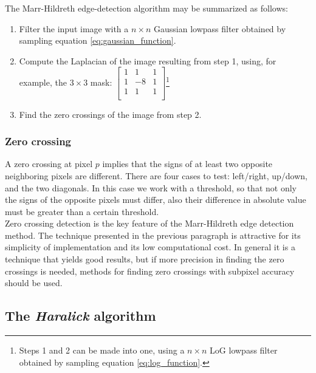 \documentclass{ipol}
\numberwithin{equation}{section}
\numberwithin{table}{section}
\begin{document}
The Marr-Hildreth edge-detection algorithm may be summarized as follows:
\begin{enumerate}
	\item Filter the input image with a $n \times n$ Gaussian lowpass filter obtained by sampling equation \ref{eq:gaussian_function}.
	\item Compute the Laplacian of the image resulting from step 1, using, for example, the $3\times3$ mask:
			$\begin{bmatrix}
			1 &  1 & 1 \\
			1 & -8 & 1 \\
			1 &  1 & 1 \\
			\end{bmatrix}$\footnote{Steps 1 and 2 can be made into one, using a $n\times n$ LoG lowpass filter obtained by sampling equation \ref{eq:log_function}.}
	\item Find the zero crossings of the image from step 2.
\end{enumerate}

\subsubsection{Zero crossing}

A zero crossing at pixel $p$ implies that the signs of at least two opposite neighboring pixels are 
different. There are four cases to test: left/right, up/down, and the two diagonals. In this case 
we work with a threshold, so that not only the signs of the opposite pixels must differ, also their 
difference in absolute value must be greater than a certain threshold.\\

Zero crossing detection is the key feature of the Marr-Hildreth edge detection method. The technique 
presented in the previous paragraph is attractive for its simplicity of implementation and its low 
computational cost. In general it is a technique that yields good results, but if more precision in 
finding the zero crossings is needed, methods for finding zero crossings with subpixel accuracy 
should be used.\\

\subsection{The \textit{Haralick} algorithm}
\end{document}

